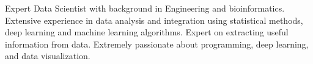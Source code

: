 \small{Expert Data Scientist with background in Engineering  and bioinformatics. Extensive experience in data analysis and integration using statistical methods, deep learning and machine learning algorithms. Expert on extracting useful information from data. Extremely
passionate about programming, deep learning, and data visualization.}


